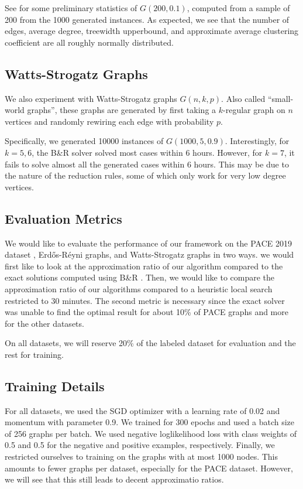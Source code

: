 \documentclass{article}
\begin{document}
See  for some preliminary statistics of $G(200, 0.1)$,
computed from a sample of 200 from the 1000 generated instances.
As expected,
we see that the number of edges,
average degree,
treewidth upperbound,
and approximate average clustering coefficient
are all roughly normally distributed.

\subsection{Watts-Strogatz Graphs}
We also experiment with Watts-Strogatz graphs $G(n, k, p)$.
Also called ``small-world graphs'',
these graphs are generated by first taking a $k$-regular graph on $n$ vertices
and randomly rewiring each edge with probability $p$.

Specifically,
we generated 10000 instances of $G(1000, 5, 0.9)$.
Interestingly, for $k=5,6$,
the B\&R solver solved most cases within 6 hours.
However, for $k=7$, it fails to solve almost all the generated cases within 6 hours.
This may be due to the nature of the reduction rules,
some of which only work for very low degree vertices.

\subsection{Evaluation Metrics}
We would like to evaluate the performance of our framework on the PACE 2019 dataset \citet{pace2019},
Erd\H os-R\'eyni graphs,
and Watts-Strogatz graphs in two ways.
we would first like to look at the approximation ratio of our algorithm compared to the exact solutions
computed using B\&R \citet{kamis}.
Then, we would like to compare the approximation ratio of our algorithms compared to a heuristic local search
restricted to 30 minutes.
The second metric is necessary since the exact solver was unable to find the optimal result for about 10\% of PACE graphs
and more for the other datasets.

On all datasets,
we will reserve 20\% of the labeled dataset for evaluation
and the rest for training.

\subsection{Training Details}
For all datasets,
we used the SGD optimizer with a learning rate of 0.02 and momentum with parameter 0.9.
We trained for 300 epochs
and used a batch size of 256 graphs per batch.
We used negative loglikelihood loss
with class weights of 0.5 and 0.5 for the negative and positive examples,
respectively.
Finally,
we restricted ourselves to training on the graphs with at most 1000 nodes.
This amounts to fewer graphs per dataset,
especially for the PACE dataset.
However,
we will see that this still leads to decent approximatio ratios.
\end{document}
